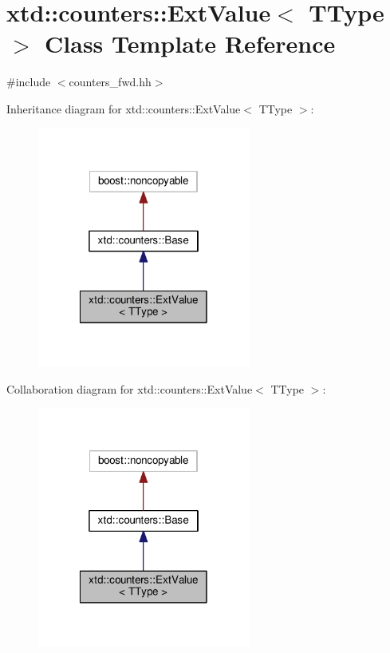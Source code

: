 \hypertarget{classxtd_1_1counters_1_1ExtValue}{\section{xtd\-:\-:counters\-:\-:Ext\-Value$<$ T\-Type $>$ Class Template Reference}
\label{classxtd_1_1counters_1_1ExtValue}
}


{\ttfamily \#include $<$counters\-\_\-fwd.\-hh$>$}



Inheritance diagram for xtd\-:\-:counters\-:\-:Ext\-Value$<$ T\-Type $>$\-:
\nopagebreak
\begin{figure}[H]
\begin{center}
\leavevmode
\includegraphics[width=198pt]{classxtd_1_1counters_1_1ExtValue__inherit__graph}
\end{center}
\end{figure}


Collaboration diagram for xtd\-:\-:counters\-:\-:Ext\-Value$<$ T\-Type $>$\-:
\nopagebreak
\begin{figure}[H]
\begin{center}
\leavevmode
\includegraphics[width=198pt]{classxtd_1_1counters_1_1ExtValue__coll__graph}
\end{center}
\end{figure}
